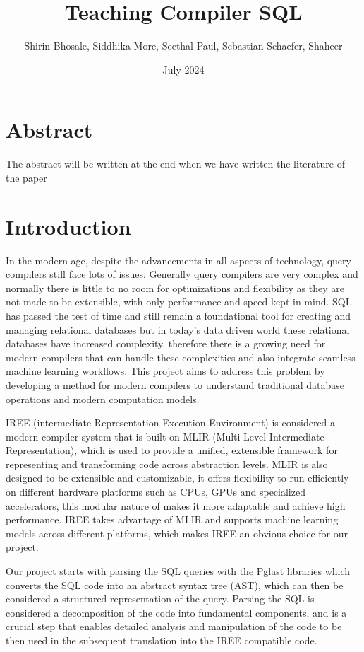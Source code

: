 \documentclass{article}
\title{Teaching Compiler SQL}
\author{Shirin Bhosale, Siddhika More, Seethal Paul, Sebastian Schaefer, Shaheer}
\date{July 2024}
\begin{document}
  
\maketitle
  
\tableofcontents

\section*{Abstract}

The abstract will be written at the end when we have written the literature of the paper

\section{Introduction}
In the modern age, despite the advancements in all aspects of technology, query compilers still face lots of issues. Generally query compilers are very complex and normally there is little to no room for optimizations and flexibility as they are not made to be extensible, with only performance and speed kept in mind. SQL has passed the test of time and still remain a foundational tool for creating and managing relational databases but in today's data driven world these relational databases have increased complexity, therefore there is a growing need for modern compilers that can handle these complexities and also integrate seamless machine learning workflows. This project aims to address this problem by developing a method for modern compilers to understand traditional database operations and modern computation models.

IREE (intermediate Representation Execution Environment) is considered a modern compiler system that is built on MLIR (Multi-Level Intermediate Representation), which is used to provide a unified, extensible framework for representing and transforming code across abstraction levels. MLIR is also designed to be extensible and customizable, it offers flexibility to run efficiently on different hardware platforms such as CPUs, GPUs and specialized accelerators, this modular nature of makes it more adaptable and achieve high performance. IREE takes advantage of MLIR and supports machine learning models across different platforms, which makes IREE an obvious choice for our project.

Our project starts with parsing the SQL queries with the Pglast libraries which converts the SQL code into an abstract syntax tree (AST), which can then be considered a structured representation of the query. Parsing the SQL is considered a decomposition of the code into fundamental components, and is a crucial step that enables detailed analysis and manipulation of the code to be then used in the subsequent translation into the IREE compatible code.
\end{document}
